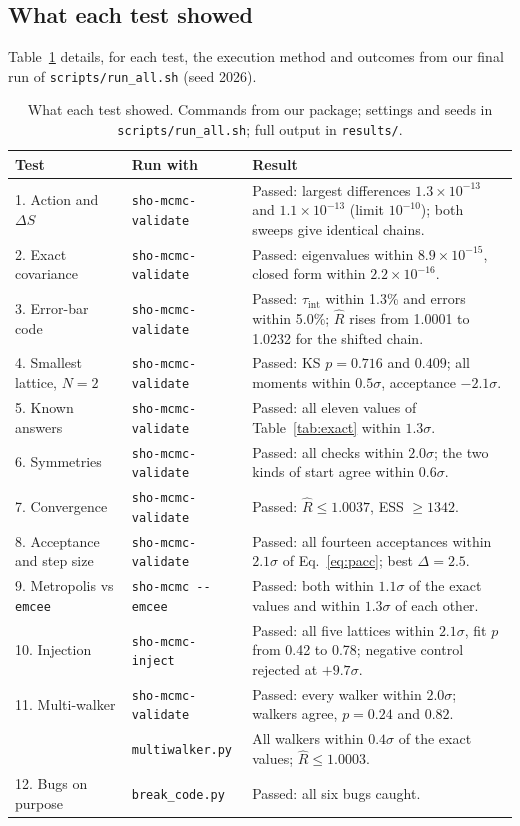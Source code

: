 \documentclass[11pt]{article}
\begin{document}
\subsection{What each test showed}

Table~\ref{tab:results} details, for each test, the execution method and
outcomes from our final run of \texttt{scripts/run\_all.sh} (seed 2026).

\begin{table}[htbp]
\centering
\footnotesize
\setlength{\tabcolsep}{3pt}
\begin{tabular}{p{2.7cm}p{3.0cm}p{5.6cm}}
\toprule
Test & Run with & Result\\
\midrule
1. Action and $\Delta S$ & \texttt{sho-mcmc-validate} & Passed: largest
differences $1.3\times10^{-13}$ and $1.1\times10^{-13}$ (limit $10^{-10}$); both
sweeps give identical chains.\\
2. Exact covariance & \texttt{sho-mcmc-validate} & Passed: eigenvalues within
$8.9\times10^{-15}$, closed form within $2.2\times10^{-16}$.\\
3. Error-bar code & \texttt{sho-mcmc-validate} & Passed: $\tau_{\mathrm{int}}$
within 1.3\% and errors within 5.0\%; $\hat{R}$ rises from 1.0001 to 1.0232 for
the shifted chain.\\
4. Smallest lattice, $N = 2$ & \texttt{sho-mcmc-validate} & Passed: KS
$p = 0.716$ and $0.409$; all moments within $0.5\sigma$, acceptance
$-2.1\sigma$.\\
5. Known answers & \texttt{sho-mcmc-validate} & Passed: all eleven values of
Table~\ref{tab:exact} within $1.3\sigma$.\\
6. Symmetries & \texttt{sho-mcmc-validate} & Passed: all checks within
$2.0\sigma$; the two kinds of start agree within $0.6\sigma$.\\
7. Convergence & \texttt{sho-mcmc-validate} & Passed: $\hat{R} \le 1.0037$,
ESS $\ge 1342$.\\
8. Acceptance and step size & \texttt{sho-mcmc-validate} & Passed: all fourteen
acceptances within $2.1\sigma$ of Eq.~\eqref{eq:pacc}; best $\Delta = 2.5$.\\
9. Metropolis vs \texttt{emcee} & \texttt{sho-mcmc -{}-emcee} & Passed: both
within $1.1\sigma$ of the exact values and within $1.3\sigma$ of each other.\\
10. Injection & \texttt{sho-mcmc-inject} & Passed: all five lattices within
$2.1\sigma$, fit $p$ from 0.42 to 0.78; negative control rejected at
$+9.7\sigma$.\\
11. Multi-walker & \texttt{sho-mcmc-validate} & Passed: every walker within
$2.0\sigma$; walkers agree, $p = 0.24$ and $0.82$.\\
 & \texttt{multiwalker.py} & All walkers within $0.4\sigma$ of the exact
values; $\hat{R} \le 1.0003$.\\
12. Bugs on purpose & \texttt{break\_code.py} & Passed: all six bugs caught.\\
\bottomrule
\end{tabular}
\caption{What each test showed. Commands from our package; settings and
seeds in \texttt{scripts/run\_all.sh}; full output in \texttt{results/}.}
\label{tab:results}
\end{table}
\end{document}
